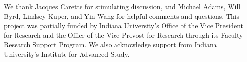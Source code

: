 \documentclass[preprint]{sigplanconf}
\begin{document}
\acks We thank Jacques Carette for stimulating discussion, and Michael Adams,
Will Byrd, Lindsey Kuper, and Yin Wang for helpful comments and
questions. This project was partially funded by Indiana University's Office
of the Vice President for Research and the Office of the Vice Provost for
Research through its Faculty Research Support Program.  We also acknowledge
support from Indiana University's Institute for Advanced Study.

\begin{small}


\end{small}
\end{document}
